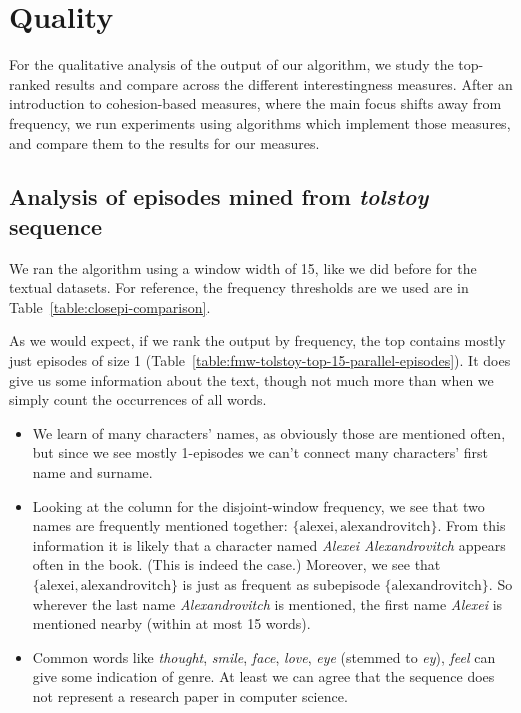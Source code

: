 \section{Quality}

For the qualitative analysis of the output of our algorithm, we study the top-ranked results and compare across the different interestingness measures. After an introduction to cohesion-based measures, where the main focus shifts away from frequency, we run experiments using algorithms which implement those measures, and compare them to the results for our measures.


\subsection{Analysis of episodes mined from \emph{tolstoy} sequence}
\label{sec:experiments-quality-episodes}

We ran the algorithm using a window width of 15, like we did before for the textual datasets. For reference, the frequency thresholds are we used are in Table~\ref{table:closepi-comparison}.

As we would expect, if we rank the output by frequency, the top contains mostly just episodes of size 1 (Table~\ref{table:fmw-tolstoy-top-15-parallel-episodes}). It does give us some information about the text, though not much more than when we simply count the occurrences of all words.

\begin{itemize}
\item We learn of many characters' names, as obviously those are mentioned often, but since we see mostly 1-episodes we can't connect many characters' first name and surname.
\item Looking at the column for the disjoint-window frequency, we see that two names are frequently mentioned together: $ \{ \text{alexei}, \text{alexandrovitch} \} $. From this information it is likely that a character named \emph{Alexei Alexandrovitch} appears often in the book. (This is indeed the case.) Moreover, we see that $ \{ \text{alexei}, \text{alexandrovitch} \} $ is just as frequent as subepisode $ \{ \text{alexandrovitch} \} $. So wherever the last name \emph{Alexandrovitch} is mentioned, the first name \emph{Alexei} is mentioned nearby (within at most 15 words).
\item Common words like \emph{thought}, \emph{smile}, \emph{face}, \emph{love}, \emph{eye} (stemmed to \emph{ey}), \emph{feel} can give some indication of genre. At least we can agree that the sequence does not represent a research paper in computer science.
\end{itemize}

